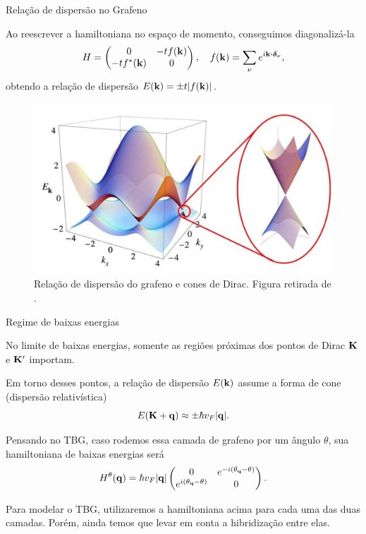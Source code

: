 \documentclass[8pt,aspectratio=169,xcolor={table,dvipsnames,usenames}]{beamer}
\begin{document}
\begin{frame}{Relação de dispersão no Grafeno}

Ao reescrever a hamiltoniana no espaço de momento, conseguimos diagonalizá-la
$$
H =
\begin{pmatrix}
0 & -t f(\k) \\
-t f^*(\k) & 0
\end{pmatrix}, \quad f(\k) = \sum_{\nu} e^{i \k \vdot \bm{\delta}_\nu},
$$
obtendo a relação de dispersão $E(\vb{k}) = \pm t \abs{f(\vb{k})}$.

\begin{figure}[H]
\centering
\includegraphics[height=0.3\linewidth]{fig/dirac.png}
\caption{Relação de dispersão do grafeno e cones de Dirac. Figura retirada de \cite{castroneto}.}
\label{fig:dirac}
\end{figure}

\end{frame}



\begin{frame}{Regime de baixas energias}

No limite de baixas energias, somente as regiões próximas dos pontos de Dirac ${\vb{K}}$ e ${\vb{K}}'$ importam.

\n

Em torno desses pontos, a relação de dispersão $E(\vb{k})$ assume a forma de cone (dispersão relativística)
$$
E({\vb{K}}+{\vb{q}}) \approx \pm \hbar v_F \abs{{\vb{q}}}.
$$

\n

Pensando no TBG, caso rodemos essa camada de grafeno por um ângulo $\theta$, sua hamiltoniana de baixas energias será
$$
H^\theta({\vb{q}}) = \hbar v_F \abs{{\vb{q}}}
\begin{pmatrix}
0 & e^{-i(\theta_{\vb{q}} - \theta)} \\
e^{i(\theta_{\vb{q}} - \theta)} & 0
\end{pmatrix}.
$$

\n

Para modelar o TBG, utilizaremos a hamiltoniana acima para cada uma das duas camadas. Porém, ainda temos que levar em conta a hibridização entre elas.

\end{frame}
\end{document}
